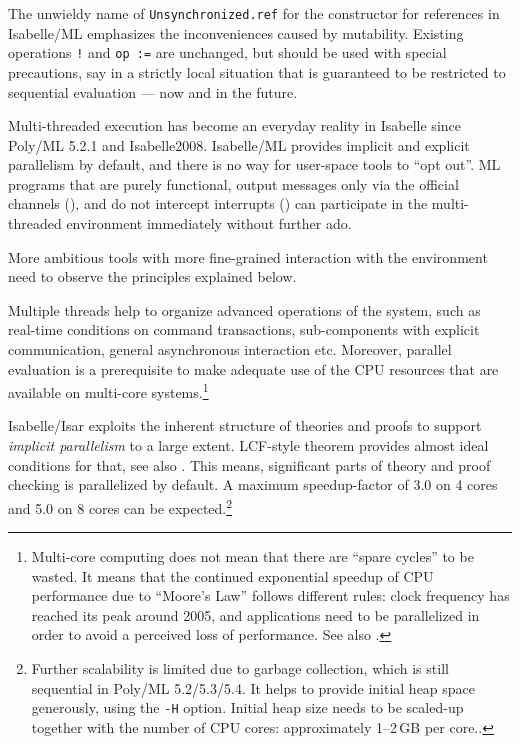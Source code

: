 \begin{isabellebody}
\begin{isamarkuptext}
  The unwieldy name of \verb|Unsynchronized.ref| for the constructor
  for references in Isabelle/ML emphasizes the inconveniences caused by
  mutability.  Existing operations \verb|!|  and \verb|op :=| are
  unchanged, but should be used with special precautions, say in a
  strictly local situation that is guaranteed to be restricted to
  sequential evaluation --- now and in the future.%
\end{isamarkuptext}%
\isamarkuptrue%
%
\isamarkuptrue%
%
\begin{isamarkuptext}%
Multi-threaded execution has become an everyday reality in
  Isabelle since Poly/ML 5.2.1 and Isabelle2008.  Isabelle/ML provides
  implicit and explicit parallelism by default, and there is no way
  for user-space tools to ``opt out''.  ML programs that are purely
  functional, output messages only via the official channels
  (), and do not intercept interrupts
  () can participate in the multi-threaded
  environment immediately without further ado.

  More ambitious tools with more fine-grained interaction with the
  environment need to observe the principles explained below.%
\end{isamarkuptext}%
\isamarkuptrue%
%
\isamarkuptrue%
%
\begin{isamarkuptext}%
Multiple threads help to organize advanced operations of the
  system, such as real-time conditions on command transactions,
  sub-components with explicit communication, general asynchronous
  interaction etc.  Moreover, parallel evaluation is a prerequisite to
  make adequate use of the CPU resources that are available on
  multi-core systems.\footnote{Multi-core computing does not mean that
  there are ``spare cycles'' to be wasted.  It means that the
  continued exponential speedup of CPU performance due to ``Moore's
  Law'' follows different rules: clock frequency has reached its peak
  around 2005, and applications need to be parallelized in order to
  avoid a perceived loss of performance.  See also
  \cite{Sutter:2005}.}

  Isabelle/Isar exploits the inherent structure of theories and proofs
  to support \emph{implicit parallelism} to a large extent.  LCF-style
  theorem provides almost ideal conditions for that, see also
  \cite{Wenzel:2009}.  This means, significant parts of theory and
  proof checking is parallelized by default.  A maximum speedup-factor
  of 3.0 on 4 cores and 5.0 on 8 cores can be
  expected.\footnote{Further scalability is limited due to garbage
  collection, which is still sequential in Poly/ML 5.2/5.3/5.4.  It
  helps to provide initial heap space generously, using the
  \texttt{-H} option.  Initial heap size needs to be scaled-up
  together with the number of CPU cores: approximately 1--2\,GB per
  core..}


\end{isamarkuptext}
\end{isabellebody}
